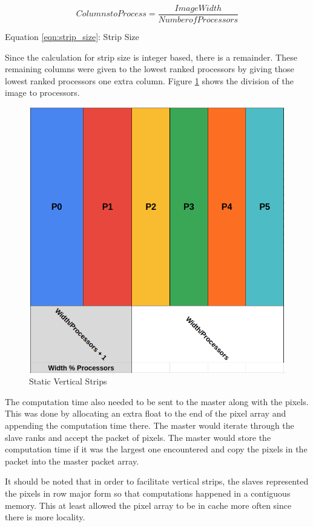 \documentclass[11pt]{article}
\begin{document}
		\begin{equation}\label{eqn:strip_size}
			Columns to Process = \frac{Image Width}{Number of Processors}
		\end{equation}
		\begin{center}
			Equation \ref{eqn:strip_size}: Strip Size
		\end{center}
	
		Since the calculation for strip size is integer based, there is a remainder. These remaining columns were given to the lowest ranked processors by giving those lowest ranked processors one extra column. Figure \ref{fig:strips} shows the division of the image to processors.
		
		\begin{figure}[H]
			\centering
			\includegraphics[width=0.7\linewidth]{Pictures/Strips}
			\caption{Static Vertical Strips}
			\label{fig:strips}
		\end{figure}
	
		The computation time also needed to be sent to the master along with the pixels. This was done by allocating an extra float to the end of the pixel array and appending the computation time there. The master would iterate through the slave ranks and accept the packet of pixels. The master would store the computation time if it was the largest one encountered and copy the pixels in the packet into the master packet array. 
		
		It should be noted that in order to facilitate vertical strips, the slaves represented the pixels in row major form so that computations happened in a contiguous memory. This at least allowed the pixel array to be in cache more often since there is more locality. 
	
\end{document}
